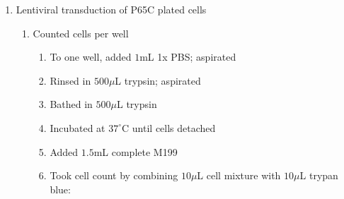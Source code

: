 \begin{enumerate}
	\item Lentiviral transduction of P65C plated cells
		\begin{enumerate}
			\item Counted cells per well
				\begin{enumerate}
					\item To one well, added $1$mL 1x PBS; aspirated
					\item Rinsed in $500\mu$L trypsin; aspirated
					\item Bathed in $500\mu$L trypsin
					\item Incubated at $37^{\circ}$C until cells detached
					\item Added $1.5$mL complete M199
					\item Took cell count by combining $10\mu$L cell mixture with $10\mu$L trypan blue:
			

\end{enumerate}
\end{enumerate}
\end{enumerate}

